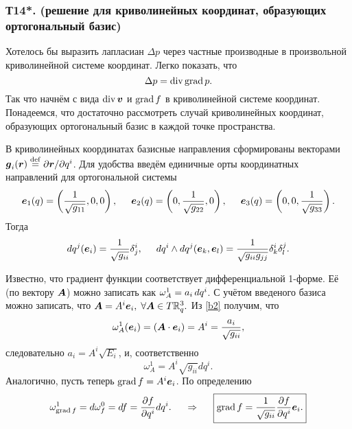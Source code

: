 \subsubsection*{Т14*. (решение для криволинейных координат, образующих ортогональный базис) }


Хотелось бы выразить лапласиан $\Delta p$ через частные производные в произвольной криволинейной системе координат. Легко показать, что
\begin{equation}
    \Delta p = \mathop{\mathrm{div}}\nolimits \mathop{\mathrm{grad}}\nolimits p.
\end{equation}
Так что начнём с вида $\mathop{\mathrm{div}}\nolimits \mbox{\boldmath $v$}$ и $\mathop{\mathrm{grad}}\nolimits f$ в криволинейной системе координат. Понадеемся, что достаточно рассмотреть случай криволинейных координат, образующих ортогональный базис в каждой точке пространства. 

В криволинейных координатах базисные направления сформированы векторами $\mbox{\boldmath $g$}_i (\mbox{\boldmath $r$}) \overset{\mathrm{def}}{=} \partial \mbox{\boldmath $r$} / \partial q^i$. Для удобства введём единичные орты координатных направлений для ортогональной системы
\begin{equation}
\label{b1}
    \mbox{\boldmath $e$}_1 (q) = \left(
        \frac{1}{\sqrt{g_{11}}}, 0, 0
    \right), \hspace{0.5cm} 
    \mbox{\boldmath $e$}_2 (q) = \left(
        0, \frac{1}{\sqrt{g_{22}}}, 0
    \right), \hspace{0.5cm} 
    \mbox{\boldmath $e$}_3 (q) = \left(
        0, 0, \frac{1}{\sqrt{g_{33}}}
    \right).
\end{equation}
Тогда
\begin{align}
\label{b2}
    d q^j (\mbox{\boldmath $e$}_i) = \frac{1}{\sqrt{g_{ii}}} \delta^i_j,
    \hspace{0.5cm} 
    dq^i \wedge d q^j (\mbox{\boldmath $e$}_k, \mbox{\boldmath $e$}_l) = \frac{1}{\sqrt{g_{ii} g_{jj}}} \delta^{i}_{k} \delta^j_l.
\end{align}


Известно, что градиент функции соответствует дифференциальной 1-форме. 
Её (по вектору $\mbox{\boldmath $A$}$) можно записать как $\omega^1_{A} = a_i \, d q^i$.
С учётом введеного базиса можно записать, что 
$ \mbox{\boldmath $A$} = A^i \mbox{\boldmath $e$}_i, \; \forall \mbox{\boldmath $A$} \in T \mathbb{R}_q^3. $
Из \eqref{b2} получим, что
$$
    \omega^1_A (\mbox{\boldmath $e$}_i) = (\mbox{\boldmath $A$} \cdot \mbox{\boldmath $e$}_i) = A^i = \frac{a_i}{\sqrt{g_{ii}}},
$$
следовательно $a_i = A^i \sqrt{E_i}$, и, соответственно
\begin{equation}
    \omega^1_A = A^i \sqrt{g_{ii}} dq^i.
\end{equation}
Аналогично, пусть теперь $\mathop{\mathrm{grad}}\nolimits f = A^i \mbox{\boldmath $e$}_i$. По определению
$$
    \omega^1_{\mathop{\mathrm{grad}}\nolimits f} = d \omega_f^0 = d f = \frac{\partial f}{\partial q^i} d q^i.
    \hspace{0.5cm} \Rightarrow \hspace{0.5cm} 
    \boxed{
        \mathop{\mathrm{grad}}\nolimits f = \frac{1}{\sqrt{g_{ii}}}  \frac{\partial f}{\partial q^i} \mbox{\boldmath $e$}_i.    
    }
$$

